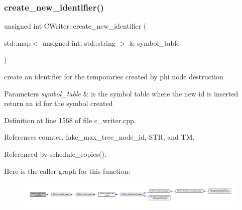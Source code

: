 \subsubsection{\texorpdfstring{create\+\_\+new\+\_\+identifier()}{create\_new\_identifier()}}
{\footnotesize\ttfamily unsigned int C\+Writer\+::create\+\_\+new\+\_\+identifier (\begin{DoxyParamCaption}\item[{std\+::map$<$ unsigned int, std\+::string $>$ \&}]{symbol\+\_\+table }\end{DoxyParamCaption})\hspace{0.3cm}{\ttfamily [protected]}}



create an identifier for the temporaries created by phi node destruction 


\begin{DoxyParams}{Parameters}
{\em symbol\+\_\+table} & is the symbol table where the new id is inserted return an id for the symbol created \\
\hline
\end{DoxyParams}


Definition at line 1568 of file c\+\_\+writer.\+cpp.



References counter, fake\+\_\+max\+\_\+tree\+\_\+node\+\_\+id, S\+TR, and TM.



Referenced by schedule\+\_\+copies().

Here is the caller graph for this function\+:
\nopagebreak
\begin{figure}[H]
\begin{center}
\leavevmode
\includegraphics[width=350pt]{d3/d59/classCWriter_a9eadef932300ac395a17c244453a580f_icgraph}
\end{center}
\end{figure}
\mbox{\label{classCWriter_ac5dc8feea1af06fe1d58f10fbe91eaf2}} 
